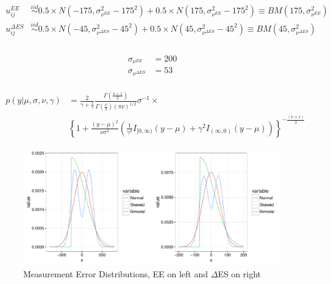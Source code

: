 \documentclass[11pt]{article}\usepackage[]{graphicx}\usepackage[]{color}
\makeatletter
\def\maxwidth{ %
  \ifdim\Gin@nat@width>\linewidth
    \linewidth
  \else
    \Gin@nat@width
  \fi
}
\newenvironment{knitrout}{}{} %
\makeatother
\begin{document}
\begin{align}
  \begin{split}
  \label{bnerror}
  u_{ij}^{EE} &\overset{iid}{\sim} 0.5\times N(-175,\sigma_{\nu^{EE}}^2-175^2) +
   0.5\times N(175,\sigma_{\nu^{EE}}^2-175^2) \equiv BM(175,\sigma_{\nu^{EE}}^2)\\
  u_{ij}^{\Delta ES} &\overset{iid}{\sim} 0.5\times N(-45,\sigma_{\nu^{\Delta ES}}^2-45^2) +  0.5\times N(45,\sigma_{\nu^{\Delta ES}}^2-45^2) \equiv BM(45,\sigma_{\nu^{\Delta ES}}^2)\\
  \end{split}
\end{align}

  
\begin{align}
  \begin{split}
   \label{goldvar}
   \sigma_{\nu^{EE}} &= 200 \\
   \sigma_{\nu^{\Delta ES}} &= 53
   \end{split}
\end{align}



\begin{align}
\begin{split}
\label{snorm}
  p(y|\mu,\sigma,\nu,\gamma) &= \frac{2}{\gamma+\frac{1}{\gamma}} \frac{\Gamma \left( \frac{\nu+1}{2} \right)}{\Gamma\left(\frac{\nu}{2}\right) (\pi\nu)^{1/2}} \sigma^{-1} \times \\
 & \left\{ 1+ \frac{(y-\mu)^2}{\nu\sigma^2} \left( \frac{1}{\gamma^2} I_{[0,\infty)} (y-\mu) + \gamma^2 I_{(\infty,0)} (y-\mu) \right)  \right\}^{-\frac{(\nu+1)}{2}}
 \end{split}
\end{align}

\begin{knitrout}
\color{fgcolor}\begin{figure}

{\centering \includegraphics[width=\maxwidth]{figure/errordist-1} 

}

\caption[Measurement Error Distributions, EE on left and ]{Measurement Error Distributions, EE on left and $\Delta$ES on right}\label{fig:errordist}
\end{figure}


\end{knitrout}
\end{document}
